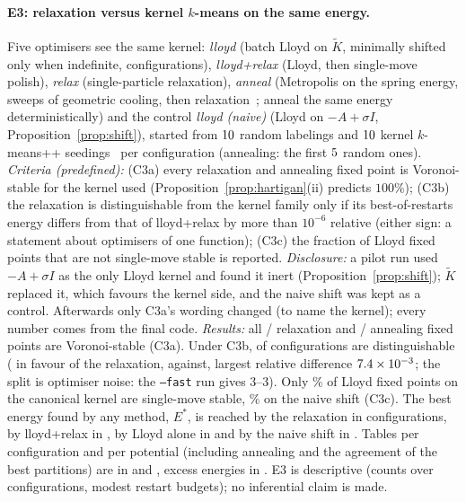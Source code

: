 \documentclass[11pt,a4paper]{article}
\theoremstyle{plain}
\theoremstyle{definition}
\theoremstyle{remark}
\begin{document}
\paragraph{E3: relaxation versus kernel $k$-means on the same energy.} Five optimisers see the same kernel: \emph{lloyd} (batch Lloyd on $\widetilde K$, minimally shifted only when indefinite, \EthreeShiftedConfigs{} configurations), \emph{lloyd+relax} (Lloyd, then single-move polish), \emph{relax} (single-particle relaxation), \emph{anneal} (Metropolis on the spring energy, \EthreeAnnealSweeps{} sweeps of geometric cooling, then relaxation~\citep{kirkpatrick1983}; \citet{hofmann1997} anneal the same energy deterministically) and the control \emph{lloyd (naive)} (Lloyd on $-A+\sigma I$, Proposition~\ref{prop:shift}), started from $10$ random labelings and $10$ kernel $k$-means++ seedings~\citep{arthur2007} per configuration (annealing: the first $5$ random ones). \emph{Criteria (predefined):} (C3a) every relaxation and annealing fixed point is Voronoi-stable for the kernel used (Proposition~\ref{prop:hartigan}(ii) predicts $100\%$); (C3b) the relaxation is distinguishable from the kernel family only if its best-of-restarts energy differs from that of lloyd+relax by more than $10^{-6}$ relative (either sign: a statement about optimisers of one function); (C3c) the fraction of Lloyd fixed points that are not single-move stable is reported. \emph{Disclosure:} a pilot run used $-A+\sigma I$ as the only Lloyd kernel and found it inert (Proposition~\ref{prop:shift}); $\widetilde K$ replaced it, which favours the kernel side, and the naive shift was kept as a control. Afterwards only C3a's wording changed (to name the kernel); every number comes from the final code. \emph{Results:} all \EthreeVoronoiRelax/\EthreeRunsRelax{} relaxation and \EthreeVoronoiAnneal/\EthreeRunsAnneal{} annealing fixed points are Voronoi-stable (C3a). Under C3b, \EthreeDistinguishable{} of \EthreeConfigs{} configurations are distinguishable (\EthreeRelaxBetter{} in favour of the relaxation, \EthreeLloydRelaxBetter{} against, largest relative difference $7.4\times 10^{-3}$; the split is optimiser noise: the \texttt{--fast} run gives 3--3). Only \EthreeLloydHartiganPct\% of Lloyd fixed points on the canonical kernel are single-move stable, \EthreeNaiveHartiganPct\% on the naive shift (C3c). The best energy found by any method, $E^*$, is reached by the relaxation in \EthreeReachRelax{} configurations, by lloyd+relax in \EthreeReachLloydRelax, by Lloyd alone in \EthreeReachLloyd{} and by the naive shift in \EthreeReachNaive. Tables per configuration and per potential (including annealing and the agreement of the best partitions) are in  and , excess energies in . E3 is descriptive (counts over \EthreeConfigs{} configurations, modest restart budgets); no inferential claim is made.
\end{document}
